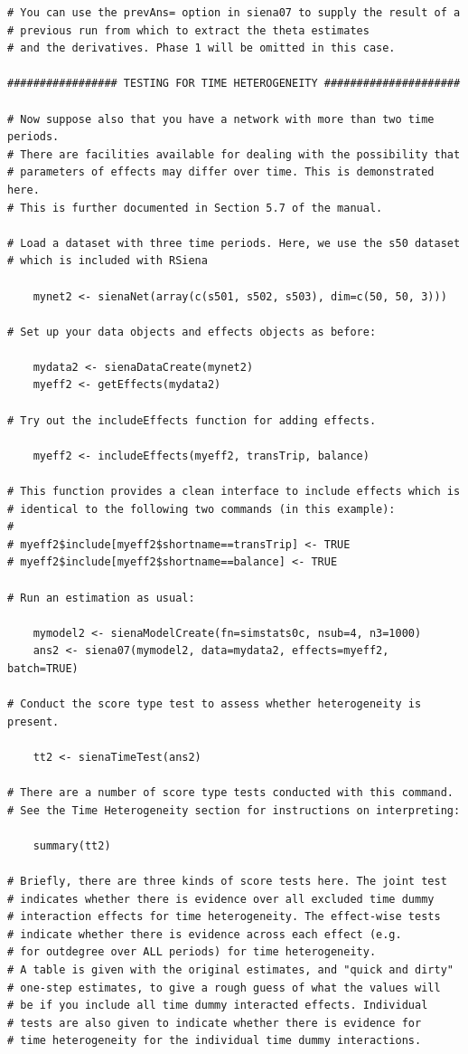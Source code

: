 \documentclass[a4paper,fleqn]{article}
\newcommand{\+}{\, + \,}
\begin{document}
{\begin{verbatim}
# You can use the prevAns= option in siena07 to supply the result of a
# previous run from which to extract the theta estimates
# and the derivatives. Phase 1 will be omitted in this case.

################# TESTING FOR TIME HETEROGENEITY #####################
 
# Now suppose also that you have a network with more than two time periods.
# There are facilities available for dealing with the possibility that
# parameters of effects may differ over time. This is demonstrated here.
# This is further documented in Section 5.7 of the manual.
 
# Load a dataset with three time periods. Here, we use the s50 dataset
# which is included with RSiena

    mynet2 <- sienaNet(array(c(s501, s502, s503), dim=c(50, 50, 3)))
 
# Set up your data objects and effects objects as before:
 
    mydata2 <- sienaDataCreate(mynet2)
    myeff2 <- getEffects(mydata2)

# Try out the includeEffects function for adding effects.
 
    myeff2 <- includeEffects(myeff2, transTrip, balance)

# This function provides a clean interface to include effects which is
# identical to the following two commands (in this example):
#
# myeff2$include[myeff2$shortname==transTrip] <- TRUE
# myeff2$include[myeff2$shortname==balance] <- TRUE

# Run an estimation as usual:
 
    mymodel2 <- sienaModelCreate(fn=simstats0c, nsub=4, n3=1000)
    ans2 <- siena07(mymodel2, data=mydata2, effects=myeff2, batch=TRUE)
 
# Conduct the score type test to assess whether heterogeneity is present.
 
    tt2 <- sienaTimeTest(ans2)

# There are a number of score type tests conducted with this command.
# See the Time Heterogeneity section for instructions on interpreting:

    summary(tt2)
 
# Briefly, there are three kinds of score tests here. The joint test
# indicates whether there is evidence over all excluded time dummy
# interaction effects for time heterogeneity. The effect-wise tests
# indicate whether there is evidence across each effect (e.g.
# for outdegree over ALL periods) for time heterogeneity.
# A table is given with the original estimates, and "quick and dirty"
# one-step estimates, to give a rough guess of what the values will
# be if you include all time dummy interacted effects. Individual
# tests are also given to indicate whether there is evidence for
# time heterogeneity for the individual time dummy interactions.



\end{verbatim}}
\end{document}
